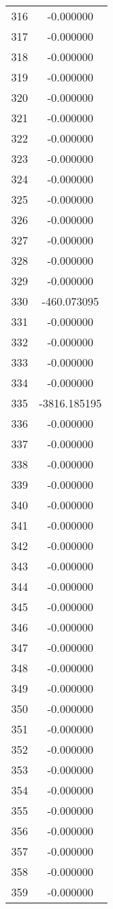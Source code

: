 \documentclass[12pt]{article}
\begin{document}
\begin{longtable}{@{}cc@{}}
316 & -0.000000 \\
317 & -0.000000 \\
318 & -0.000000 \\
319 & -0.000000 \\
320 & -0.000000 \\
321 & -0.000000 \\
322 & -0.000000 \\
323 & -0.000000 \\
324 & -0.000000 \\
325 & -0.000000 \\
326 & -0.000000 \\
327 & -0.000000 \\
328 & -0.000000 \\
329 & -0.000000 \\
330 & -460.073095 \\
331 & -0.000000 \\
332 & -0.000000 \\
333 & -0.000000 \\
334 & -0.000000 \\
335 & -3816.185195 \\
336 & -0.000000 \\
337 & -0.000000 \\
338 & -0.000000 \\
339 & -0.000000 \\
340 & -0.000000 \\
341 & -0.000000 \\
342 & -0.000000 \\
343 & -0.000000 \\
344 & -0.000000 \\
345 & -0.000000 \\
346 & -0.000000 \\
347 & -0.000000 \\
348 & -0.000000 \\
349 & -0.000000 \\
350 & -0.000000 \\
351 & -0.000000 \\
352 & -0.000000 \\
353 & -0.000000 \\
354 & -0.000000 \\
355 & -0.000000 \\
356 & -0.000000 \\
357 & -0.000000 \\
358 & -0.000000 \\
359 & -0.000000 \\

\end{longtable}
\end{document}
